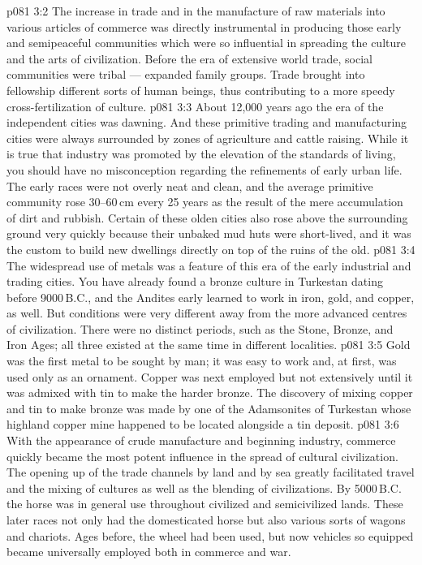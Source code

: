 \vs p081 3:2 The increase in trade and in the manufacture of raw materials into various articles of commerce was directly instrumental in producing those early and semipeaceful communities which were so influential in spreading the culture and the arts of civilization. Before the era of extensive world trade, social communities were tribal --- expanded family groups. Trade brought into fellowship different sorts of human beings, thus contributing to a more speedy cross\hyp{}fertilization of culture.
\vs p081 3:3 About 12,000 years ago the era of the independent cities was dawning. And these primitive trading and manufacturing cities were always surrounded by zones of agriculture and cattle raising. While it is true that industry was promoted by the elevation of the standards of living, you should have no misconception regarding the refinements of early urban life. The early races were not overly neat and clean, and the average primitive community rose 30--60\,cm every 25 years as the result of the mere accumulation of dirt and rubbish. Certain of these olden cities also rose above the surrounding ground very quickly because their unbaked mud huts were short\hyp{}lived, and it was the custom to build new dwellings directly on top of the ruins of the old.
\vs p081 3:4 \pc The widespread use of metals was a feature of this era of the early industrial and trading cities. You have already found a bronze culture in Turkestan dating before 9000\,B.C., and the Andites early learned to work in iron, gold, and copper, as well. But conditions were very different away from the more advanced centres of civilization. There were no distinct periods, such as the Stone, Bronze, and Iron Ages; all three existed at the same time in different localities.
\vs p081 3:5 Gold was the first metal to be sought by man; it was easy to work and, at first, was used only as an ornament. Copper was next employed but not extensively until it was admixed with tin to make the harder bronze. The discovery of mixing copper and tin to make bronze was made by one of the Adamsonites of Turkestan whose highland copper mine happened to be located alongside a tin deposit.
\vs p081 3:6 \pc With the appearance of crude manufacture and beginning industry, commerce quickly became the most potent influence in the spread of cultural civilization. The opening up of the trade channels by land and by sea greatly facilitated travel and the mixing of cultures as well as the blending of civilizations. By 5000\,B.C. the horse was in general use throughout civilized and semicivilized lands. These later races not only had the domesticated horse but also various sorts of wagons and chariots. Ages before, the wheel had been used, but now vehicles so equipped became universally employed both in commerce and war.
